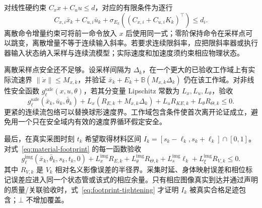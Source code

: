 \documentclass[UTF8,fontset=fandol,zihao=5,a4paper]{ctexart}
\theoremstyle{definition}
\theoremstyle{remark}\newtheorem{remark}[theorem]{说明}
\numberwithin{equation}{section}
\begin{document}
对线性硬约束 \(C_xx+C_uu\le d\)，对应的有限条件为逐行
\begin{equation}
C_{x,i}\bar x_k+C_{u,i}\bar u_k+
\sigma_{E_k}\!\left((C_{x,i}+C_{u,i}K_k)^\top\right)\le d_i.
\label{eq:input-tightening}
\end{equation}
离散命令增量约束可将前一命令放入 \(x\) 后使用同一式；零阶保持命令在采样点可以跳变，离散增量不等于连续输入斜率。若要求连续限斜率，应把限斜率器或执行器输入状态纳入采样与连续流模型；实际速度和加速度须约束相应物理状态。

离散采样点安全还不足够。设采样间隔为 \(\Delta_k\)，在一个更大的已验收工作域上有实际流速界
\(\|\dot x\|\le M_{x,k}\)，并验证
\(\bar x_k+E_k+\mathbb B(M_{x,k}\Delta_k)\)
仍在该工作域。对非线性安全函数 \(g_\ell^{\mathrm{safe}}(x,u,\theta)\)，若其分变量 Lipschitz 常数为 \(L_x,L_u,L_\theta\)，验收
\begin{equation}
g_\ell^{\mathrm{safe}}(\bar x_k,\bar u_k,\bar\theta_k)
+L_x(R_{E,k}+M_{x,k}\Delta_k)
+L_uR_{KE,k}+L_\theta R_{\Theta,k}\le0.
\label{eq:intersample-safety}
\end{equation}
更紧的连续流包络可以替换球形速度界。工作域包含条件使首次离开论证成立，避免用一个只在安全域内有效的速度界循环假定安全。

最后，在真实采图时刻 \(t_k\) 希望取得材料区间
\(I_k=[s_k-\ell_k,s_k+\ell_k]\cap[0,1]\)。对式~\eqref{eq:material-footprint} 的每一函数验收
\begin{equation}
g_\ell^{\mathrm{img}}(\bar x_k,\bar\theta_k,s_k,t_k,0)
+L_x^{\mathrm{img}}R_{E,k}
+L_\theta^{\mathrm{img}}R_{\Theta,k}
+L_s^{\mathrm{img}}\ell_k
+L_\xi^{\mathrm{img}}R_{V,k}\le0.
\label{eq:footprint-tightening}
\end{equation}
其中 \(R_{V,k}\) 是 \(V_k\) 相对名义影像误差的半径界。采集时延、身体映射误差和相位标记误差应进入同一个状态管或该式的相应余量。只有相应图像真实到达并通过声明的质量/关联验收时，式~\eqref{eq:footprint-tightening} 才证明 \(I_k\) 被真实合格足迹包含；\(\bot\) 不增加覆盖。
\end{document}
